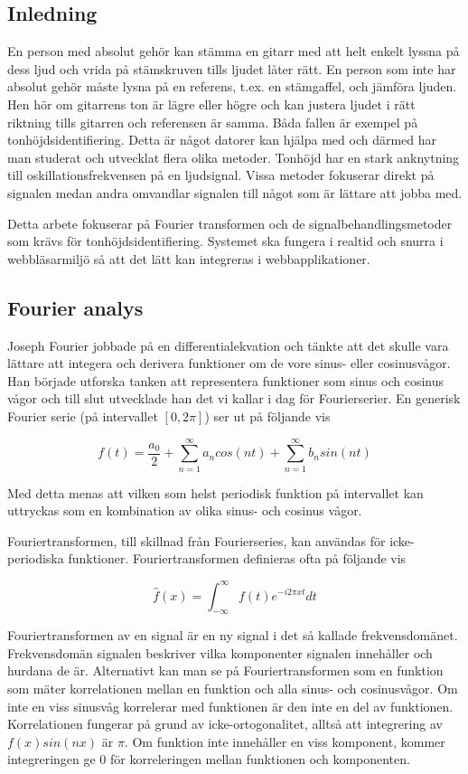 \subsection*{Inledning}
En person med absolut gehör kan stämma en gitarr med att helt enkelt lyssna på dess ljud och vrida på stämskruven tills ljudet låter rätt. En person som inte har absolut gehör måste lysna på en referens, t.ex. en stämgaffel, och jämföra ljuden. Hen hör om gitarrens ton är lägre eller högre och kan justera ljudet i rätt riktning tills gitarren och referensen är samma. Båda fallen är exempel på tonhöjdsidentifiering. Detta är något datorer kan hjälpa med och därmed har man studerat och utvecklat flera olika metoder. Tonhöjd har en stark anknytning till oskillationsfrekvensen på en ljudsignal. Vissa metoder fokuserar direkt på signalen medan andra omvandlar signalen till något som är lättare att jobba med.

Detta arbete fokuserar på Fourier transformen och de signalbehandlingsmetoder som krävs för tonhöjdsidentifiering. Systemet ska fungera i realtid och snurra i webbläsarmiljö så att det lätt kan integreras i webbapplikationer.

\subsection*{Fourier analys}
Joseph Fourier jobbade på en differentialekvation och tänkte att det skulle vara lättare att integera och derivera funktioner om de vore sinus- eller cosinusvågor. Han började utforska tanken att representera funktioner som sinus och cosinus vågor och till slut utvecklade han det vi kallar i dag för Fourierserier. En generisk Fourier serie (på intervallet $[0, 2\pi]$) ser ut på följande vis

$$f(t) = \frac{a_0}{2} + \sum_{n=1}^{\infty}a_ncos(nt)+\sum_{n=1}^{\infty}b_nsin(nt)$$

Med detta menas att vilken som helst periodisk funktion på intervallet kan uttryckas som en kombination av olika sinus- och cosinus vågor. 

Fouriertransformen, till skillnad från Fourierseries, kan användas för icke-periodiska funktioner. Fouriertransformen definieras ofta på följande vis

$$\hat{f}(x) = \int_{-\infty}^{\infty} f(t)e^{-i2\pi x t} dt$$

Fouriertransformen av en signal är en ny signal i det så kallade frekvensdomänet. Frekvensdomän signalen beskriver vilka komponenter signalen innehåller och hurdana de är. Alternativt kan man se på Fouriertransformen som en funktion som mäter korrelationen mellan en funktion och alla sinus- och cosinusvågor. Om inte en viss sinusvåg korrelerar med funktionen
är den inte en del av funktionen. Korrelationen fungerar på grund av icke-ortogonalitet, alltså att integrering av $f(x)sin(nx)$ är $\pi$. Om funktion inte innehåller en viss komponent, kommer integreringen ge $0$ för korreleringen mellan funktionen och komponenten.

